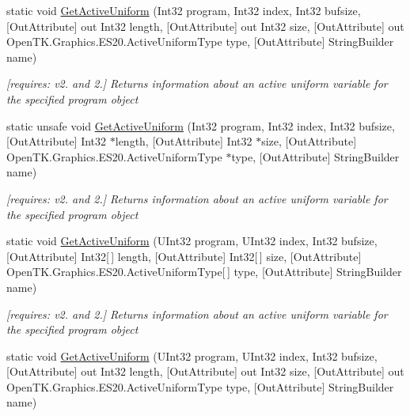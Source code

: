 \begin{DoxyCompactItemize}
static void \hyperlink{class_open_t_k_1_1_graphics_1_1_e_s20_1_1_g_l_aaf3b2a0806f022fafb8c049577eb205f}{Get\-Active\-Uniform} (Int32 program, Int32 index, Int32 bufsize, \mbox{[}Out\-Attribute\mbox{]} out Int32 length, \mbox{[}Out\-Attribute\mbox{]} out Int32 size, \mbox{[}Out\-Attribute\mbox{]} out Open\-T\-K.\-Graphics.\-E\-S20.\-Active\-Uniform\-Type type, \mbox{[}Out\-Attribute\mbox{]} String\-Builder name)
\begin{DoxyCompactList}\small\item\em \mbox{[}requires\-: v2. and 2.\mbox{]} Returns information about an active uniform variable for the specified program object \end{DoxyCompactList}\item 
static unsafe void \hyperlink{class_open_t_k_1_1_graphics_1_1_e_s20_1_1_g_l_a78a99c062ca456fcb481e5b77015e163}{Get\-Active\-Uniform} (Int32 program, Int32 index, Int32 bufsize, \mbox{[}Out\-Attribute\mbox{]} Int32 $\ast$length, \mbox{[}Out\-Attribute\mbox{]} Int32 $\ast$size, \mbox{[}Out\-Attribute\mbox{]} Open\-T\-K.\-Graphics.\-E\-S20.\-Active\-Uniform\-Type $\ast$type, \mbox{[}Out\-Attribute\mbox{]} String\-Builder name)
\begin{DoxyCompactList}\small\item\em \mbox{[}requires\-: v2. and 2.\mbox{]} Returns information about an active uniform variable for the specified program object \end{DoxyCompactList}\item 
static void \hyperlink{class_open_t_k_1_1_graphics_1_1_e_s20_1_1_g_l_a0c85c2b8e6d7d4d43e46e2573d6fd80a}{Get\-Active\-Uniform} (U\-Int32 program, U\-Int32 index, Int32 bufsize, \mbox{[}Out\-Attribute\mbox{]} Int32\mbox{[}$\,$\mbox{]} length, \mbox{[}Out\-Attribute\mbox{]} Int32\mbox{[}$\,$\mbox{]} size, \mbox{[}Out\-Attribute\mbox{]} Open\-T\-K.\-Graphics.\-E\-S20.\-Active\-Uniform\-Type\mbox{[}$\,$\mbox{]} type, \mbox{[}Out\-Attribute\mbox{]} String\-Builder name)
\begin{DoxyCompactList}\small\item\em \mbox{[}requires\-: v2. and 2.\mbox{]} Returns information about an active uniform variable for the specified program object \end{DoxyCompactList}\item 
static void \hyperlink{class_open_t_k_1_1_graphics_1_1_e_s20_1_1_g_l_a051f7d4ebc565127116592fe9c7ab1a6}{Get\-Active\-Uniform} (U\-Int32 program, U\-Int32 index, Int32 bufsize, \mbox{[}Out\-Attribute\mbox{]} out Int32 length, \mbox{[}Out\-Attribute\mbox{]} out Int32 size, \mbox{[}Out\-Attribute\mbox{]} out Open\-T\-K.\-Graphics.\-E\-S20.\-Active\-Uniform\-Type type, \mbox{[}Out\-Attribute\mbox{]} String\-Builder name)

\end{DoxyCompactItemize}
